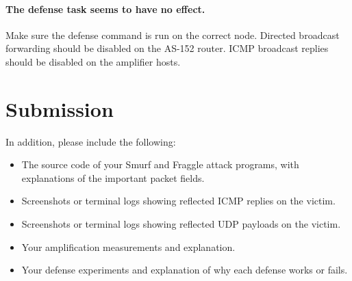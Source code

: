 \paragraph{The defense task seems to have no effect.}
Make sure the defense command is run on the correct node. Directed broadcast
forwarding should be disabled on the AS-152 router. ICMP broadcast replies
should be disabled on the amplifier hosts.


\section{Submission}

\seedsubmission

In addition, please include the following:

\begin{itemize}[noitemsep]
\item The source code of your Smurf and Fraggle attack programs, with
      explanations of the important packet fields.
\item Screenshots or terminal logs showing reflected ICMP replies on the victim.
\item Screenshots or terminal logs showing reflected UDP payloads on the victim.
\item Your amplification measurements and explanation.
\item Your defense experiments and explanation of why each defense works or
      fails.
\end{itemize}


